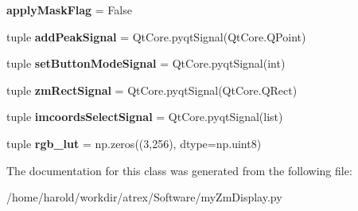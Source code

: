 \begin{DoxyCompactItemize}
\item 
\hypertarget{classmyZmDisplay_1_1myZmDisplay_a5baf38a6e9c6609307240a3c4be0bca7}{{\bfseries apply\-Mask\-Flag} = False}\label{classmyZmDisplay_1_1myZmDisplay_a5baf38a6e9c6609307240a3c4be0bca7}

\item 
\hypertarget{classmyZmDisplay_1_1myZmDisplay_a7dbe912029d1343f3839c19050e235e3}{tuple {\bfseries add\-Peak\-Signal} = Qt\-Core.\-pyqt\-Signal(Qt\-Core.\-Q\-Point)}\label{classmyZmDisplay_1_1myZmDisplay_a7dbe912029d1343f3839c19050e235e3}

\item 
\hypertarget{classmyZmDisplay_1_1myZmDisplay_aa0ea7f897243bc2529551255f512d8c3}{tuple {\bfseries set\-Button\-Mode\-Signal} = Qt\-Core.\-pyqt\-Signal(int)}\label{classmyZmDisplay_1_1myZmDisplay_aa0ea7f897243bc2529551255f512d8c3}

\item 
\hypertarget{classmyZmDisplay_1_1myZmDisplay_a24271d6d079df901d5128772fea0400b}{tuple {\bfseries zm\-Rect\-Signal} = Qt\-Core.\-pyqt\-Signal(Qt\-Core.\-Q\-Rect)}\label{classmyZmDisplay_1_1myZmDisplay_a24271d6d079df901d5128772fea0400b}

\item 
\hypertarget{classmyZmDisplay_1_1myZmDisplay_a47a941c14bc12031105afe99e85ef371}{tuple {\bfseries imcoords\-Select\-Signal} = Qt\-Core.\-pyqt\-Signal(list)}\label{classmyZmDisplay_1_1myZmDisplay_a47a941c14bc12031105afe99e85ef371}

\item 
\hypertarget{classmyZmDisplay_1_1myZmDisplay_a6fd2b18cb86a3acb62e794079a9af2ca}{tuple {\bfseries rgb\-\_\-lut} = np.\-zeros((3,256), dtype=np.\-uint8)}\label{classmyZmDisplay_1_1myZmDisplay_a6fd2b18cb86a3acb62e794079a9af2ca}

\end{DoxyCompactItemize}


The documentation for this class was generated from the following file\-:\begin{DoxyCompactItemize}
\item 
/home/harold/workdir/atrex/\-Software/my\-Zm\-Display.\-py\end{DoxyCompactItemize}
